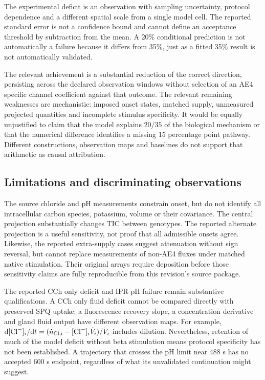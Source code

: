 The experimental deficit is an observation with sampling uncertainty, protocol dependence and a different spatial scale from a single model cell. The reported standard error is not a confidence bound and cannot define an acceptance threshold by subtraction from the mean. A 20\% conditional prediction is not automatically a failure because it differs from 35\%, just as a fitted 35\% result is not automatically validated.

The relevant achievement is a substantial reduction of the correct direction, persisting across the declared observation windows without selection of an AE4 specific channel coefficient against that outcome. The relevant remaining weaknesses are mechanistic: imposed onset states, matched supply, unmeasured projected quantities and incomplete stimulus specificity. It would be equally unjustified to claim that the model explains $20/35$ of the biological mechanism or that the numerical difference identifies a missing 15 percentage point pathway. Different constructions, observation maps and baselines do not support that arithmetic as causal attribution.

\subsection{Limitations and discriminating observations}

The source chloride and pH measurements constrain onset, but do not identify all intracellular carbon species, potassium, volume or their covariance. The central projection substantially changes TIC between genotypes. The reported alternate projection is a useful sensitivity, not proof that all admissible onsets agree. Likewise, the reported extra-supply cases suggest attenuation without sign reversal, but cannot replace measurements of non-AE4 fluxes under matched native stimulation. Their original arrays require deposition before those sensitivity claims are fully reproducible from this revision's source package.

The reported CCh only deficit and IPR pH failure remain substantive qualifications. A CCh only fluid deficit cannot be compared directly with preserved SPQ uptake: a fluorescence recovery slope, a concentration derivative and gland fluid output have different observation maps. For example, $\mathrm{d}[\mathrm{Cl}^{-}]_i/\mathrm{d} t=(\dot n_{\rm Cl,i}-[\mathrm{Cl}^{-}]_i\dot V_i)/V_i$ includes dilution. Nevertheless, retention of much of the model deficit without beta stimulation means protocol specificity has not been established. A trajectory that crosses the pH limit near 488 s has no accepted 600 s endpoint, regardless of what its unvalidated continuation might suggest.

